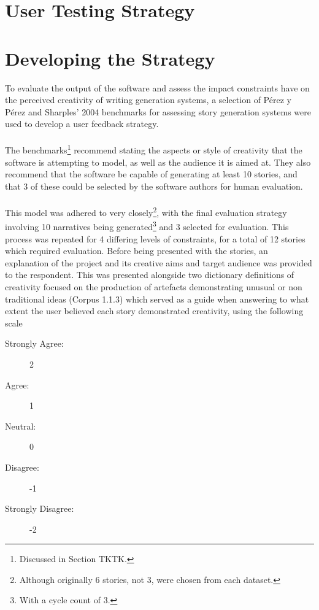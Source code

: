 \documentclass[letterpaper]{article}
\begin{document}
\section{User Testing Strategy}
\section{Developing the Strategy}
To evaluate the output of the software and assess the impact constraints have on the perceived creativity of writing generation systems, a selection of P\'erez y P\'erez and Sharples' 2004 benchmarks for assessing story generation systems were used to develop a user feedback strategy.\\
\\The benchmarks\footnote{Discussed in Section TKTK.} recommend stating the aspects or style of creativity that the software is attempting to model, as well as the audience it is aimed at. They also recommend that the software be capable of generating at least 10 stories, and that 3 of these could be selected by the software authors for human evaluation.\\ 
\\This model was adhered to very closely\footnote{Although originally 6 stories, not 3, were chosen from each dataset.}, with the final evaluation strategy involving 10 narratives being generated\footnote{With a cycle count of 3.} and 3 selected for evaluation. This process was repeated for 4 differing levels of constraints, for a total of 12 stories which required evaluation. Before being presented with the stories, an explanation of the project and its creative aims and target audience was provided to the respondent. This was presented alongside two dictionary definitions of creativity focused on the production of artefacts demonstrating unusual or non traditional ideas (Corpus 1.1.3) which served as a guide when answering to what extent the user believed each story demonstrated creativity, using the following scale
\begin{description}
\item[Strongly Agree:] 2
\item[Agree:] 1
\item[Neutral:] 0
\item[Disagree:] -1
\item[Strongly Disagree:] -2
\end{description} 
\end{document}
